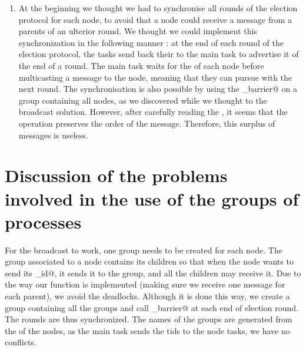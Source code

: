 \documentclass{article}
\begin{document}
\begin{enumerate}
\item At the beginning we thought we had to synchronise all rounds of the election protocol for each node, to avoid that a node could receive a message from a parents of an ulterior round. We thought we could implement this synchronization in the following manner : at the end of each round of the election protocol, the \verb@pvm@ tasks send back their \verb@tid@ to the main task to advertise it of the end of a round. The main task waits for the \verb@tid@ of each node before multicasting a \verb@go@ message to the node, meaning that they can pursue with the next round. The synchronisation is also possible by using the \verb@pvm_barrier@ on a group containing all nodes, as we discovered while we thought to the broadcast solution. However, after carefully reading the \verb@manpage@, it seems that the \verb@recv@ operation preserves the order of the message. Therefore, this surplus of messages is useless.
\end{enumerate}

\section{Discussion of the problems involved in the use of the groups of processes}
For the broadcast to work, one group needs to be created for each node. The group associated to a node contains its children so that when the node wants to send its \verb@max_id@, it sends it to the group, and all the children may receive it. Due to the way our \verb@receiveId@ function is implemented (making sure we receive one message for each parent), we avoid the deadlocks. Although it is done this way, we create a group containing all the groups and call \verb@pvm_barrier@ at each end of election round. The rounds are thus synchronized. The names of the groups are generated from the \verb@tid@ of the nodes, as the main task sends the tids to the node tasks, we have no conflicts.
 
 \normalsize
\end{document}
